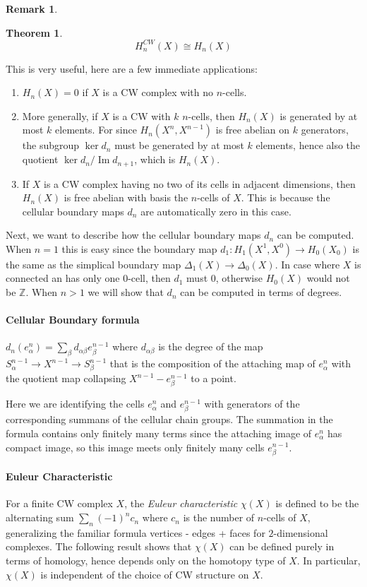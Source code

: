 \documentclass[11pt,a4paper]{article}
\theoremstyle{definition}
\newtheorem{remark}[definition]{Remark}
\theoremstyle{plain}
\newtheorem{theorem}[definition]{Theorem}
\theoremstyle{remark}
\begin{document}
\begin{remark}
\begin{theorem}
  $$H_n^{CW} (X) \cong H_n (X)$$ 
\end{theorem}
This is very useful, here are a few immediate applications: 
\begin{enumerate}[label = (\roman*)]
  \item $H_n (X) = 0$ if $X$ is a CW complex with no $n$-cells. 
  \item More generally, if $X$ is a CW with $k$ $n$-cells, then $H_n(X)$ is generated by at most $k$ elements. For since 
  $H_n (X^n, X^{n-1})$ is free abelian on $k$ generators, the subgroup $\ker d_n$ must be generated by at most $k$ elements, 
  hence also the quotient $\ker d_n / \operatorname{Im} d_{n+1}$, which is $H_n (X)$.
  \item If $X$ is a CW complex having no two of its cells in adjacent dimensions, then $H_n (X)$ is free abelian with basis 
  the $n$-cells of $X$. This is because the cellular boundary maps $d_n$ are automatically zero in this case. 
\end{enumerate}

Next, we want to describe how the cellular boundary maps $d_n$ can be computed. When $n = 1$ this is easy since the boundary 
map $d_1 \colon H_1 (X^1, X^0) \to H_0 (X_0)$ is the same as the simplical boundary map $\Delta_1 (X) \to \Delta_0 (X)$. In 
case where $X$ is connected an has only one $0$-cell, then $d_1$ must $0$, otherwise $H_0 (X)$ would not be $\mathbb{Z}$. When $n > 1$ we 
will show that $d_n$ can be computed in terms of degrees. 

\paragraph{Cellular Boundary formula} $d_n  (e^n_\alpha) = \sum_\beta d_{\alpha \beta} e_\beta^{n-1}$ where $d_{\alpha \beta}$ is 
the degree of the map $S_\alpha^{n-1} \to X^{n-1} \to S_\beta^{n-1}$ that is the composition of the attaching map of 
$e_\alpha^n$ with the quotient map collapsing $X^{n-1} - e^{n-1}_\beta$ to a point. 

Here we are identifying the cells $e^n_\alpha$ and $e^{n-1}_\beta$ with generators of the corresponding summans of the 
cellular chain groups. The summation in the formula contains only finitely many terms since the attaching image of $e_\alpha^n$ has 
compact image, so this image meets only finitely many cells $e_\beta^{n-1}$. 

\paragraph{Euleur Characteristic} For a finite CW complex $X$, the \emph{Euleur characteristic} $\chi(X)$
is defined to be the alternating sum $\sum_n (-1)^n c_n$ where $c_n$ is the number of $n$-cells of $X$, generalizing the familiar formula
vertices - edges + faces for $2$-dimensional complexes. The following result shows that $\chi(X)$ can be defined purely in terms of 
homology, hence depends only on the homotopy type of $X$. In particular, $\chi(X)$ is independent of the choice of CW structure on $X$. 


\end{remark}
\end{document}
